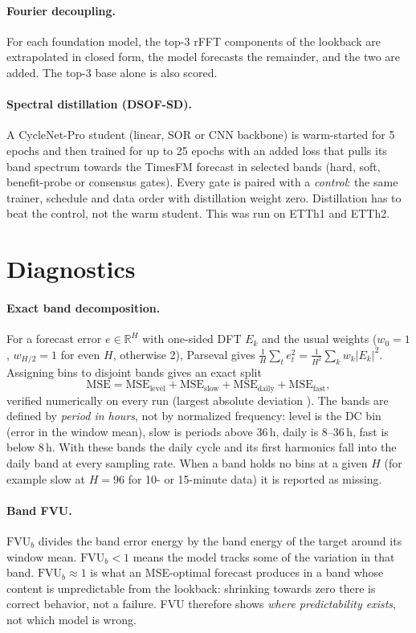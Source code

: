 \documentclass[11pt,a4paper]{article}
\begin{document}
\paragraph{Fourier decoupling.} For each foundation model, the top-3 rFFT components of the lookback are extrapolated in closed form, the model forecasts the remainder, and the two are added. The top-3 base alone is also scored.

\paragraph{Spectral distillation (DSOF-SD).} A CycleNet-Pro student (linear, SOR or CNN backbone) is warm-started for 5 epochs and then trained for up to 25 epochs with an added loss that pulls its band spectrum towards the TimesFM forecast in selected bands (hard, soft, benefit-probe or consensus gates). Every gate is paired with a \emph{control}: the same trainer, schedule and data order with distillation weight zero. Distillation has to beat the control, not the warm student. This was run on ETTh1 and ETTh2.

\section{Diagnostics}
\label{sec:diagnostics}
\paragraph{Exact band decomposition.} For a forecast error $e\in\mathbb{R}^H$ with one-sided DFT $E_k$ and the usual weights ($w_0{=}1$, $w_{H/2}{=}1$ for even $H$, otherwise 2), Parseval gives $\frac1H\sum_t e_t^2=\frac1{H^2}\sum_k w_k|E_k|^2$. Assigning bins to disjoint bands gives an exact split
\begin{equation}
\mathrm{MSE}=\mathrm{MSE}_{\text{level}}+\mathrm{MSE}_{\text{slow}}+\mathrm{MSE}_{\text{daily}}+\mathrm{MSE}_{\text{fast}},
\end{equation}
verified numerically on every run (largest absolute deviation \parsevalMaxErr). The bands are defined by \emph{period in hours}, not by normalized frequency: level is the DC bin (error in the window mean), slow is periods above 36\,h, daily is 8--36\,h, fast is below 8\,h. With these bands the daily cycle and its first harmonics fall into the daily band at every sampling rate. When a band holds no bins at a given $H$ (for example slow at $H{=}96$ for 10- or 15-minute data) it is reported as missing.

\paragraph{Band FVU.} $\mathrm{FVU}_b$ divides the band error energy by the band energy of the target around its window mean. $\mathrm{FVU}_b<1$ means the model tracks some of the variation in that band. $\mathrm{FVU}_b\approx 1$ is what an MSE-optimal forecast produces in a band whose content is unpredictable from the lookback: shrinking towards zero there is correct behavior, not a failure. FVU therefore shows \emph{where predictability exists}, not which model is wrong.
\end{document}
